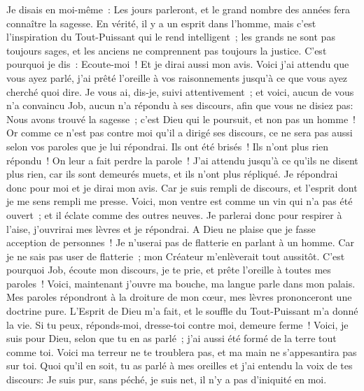 \begin{multicols}{2}
Je disais en moi-même~: Les jours parleront, et le grand nombre des années fera connaître la sagesse.
En vérité, il y a un esprit dans l'homme, mais c'est l'inspiration du Tout-Puissant qui le rend intelligent~;
les grands ne sont pas toujours sages, et les anciens ne comprennent pas toujours la justice.
C'est pourquoi je dis~: Ecoute-moi~! Et je dirai aussi mon avis.
Voici j'ai attendu que vous ayez parlé, j'ai prêté l'oreille à vos raisonnements jusqu'à ce que vous ayez cherché quoi dire.
Je vous ai, dis-je, suivi attentivement~; et voici, aucun de vous n'a convaincu Job, aucun n'a répondu à ses discours,
afin que vous ne disiez pas: Nous avons trouvé la sagesse~; c'est Dieu qui le poursuit, et non pas un homme~!
Or comme ce n'est pas contre moi qu'il a dirigé ses discours, ce ne sera pas aussi selon vos paroles que je lui répondrai. 
Ils ont été brisés~! Ils n'ont plus rien répondu~! On leur a fait perdre la parole~!
J'ai attendu jusqu'à ce qu'ils ne disent plus rien, car ils sont demeurés muets, et ils n'ont plus répliqué.
Je répondrai donc pour moi et je dirai mon avis. 
Car je suis rempli de discours, et l'esprit dont je me sens rempli me presse.
Voici, mon ventre est comme un vin qui n'a pas été ouvert~; et il éclate comme des outres neuves.
Je parlerai donc pour respirer à l'aise, j'ouvrirai mes lèvres et je répondrai.
A Dieu ne plaise que je fasse acception de personnes~! Je n'userai pas de flatterie en parlant à un homme.
Car je ne sais pas user de flatterie~; mon Créateur m'enlèverait tout aussitôt.
\VerseOne{}C'est pourquoi Job, écoute mon discours, je te prie, et prête l'oreille à toutes mes paroles~!
Voici, maintenant j'ouvre ma bouche, ma langue parle dans mon palais.
Mes paroles répondront à la droiture de mon cœur, mes lèvres prononceront une doctrine pure.
L'Esprit de Dieu m'a fait, et le souffle du Tout-Puissant m'a donné la vie.
Si tu peux, réponds-moi, dresse-toi contre moi, demeure ferme~!
Voici, je suis pour Dieu, selon que tu en as parlé~; j'ai aussi été formé de la terre tout comme toi.
Voici ma terreur ne te troublera pas, et ma main ne s'appesantira pas sur toi.
Quoi qu'il en soit, tu as parlé à mes oreilles et j'ai entendu la voix de tes discours:
Je suis pur, sans péché, je suis net, il n'y a pas d'iniquité en moi.

\end{multicols}
